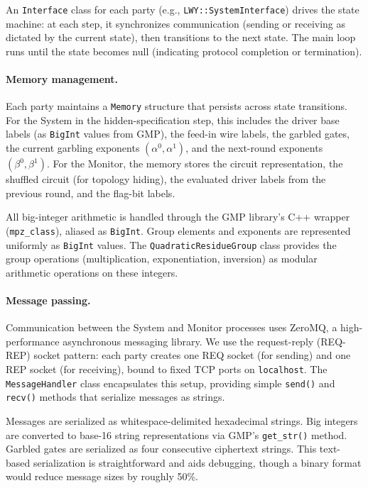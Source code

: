 An \texttt{Interface} class for each party (e.g., \texttt{LWY::SystemInterface}) drives the state machine: at each step, it synchronizes communication (sending or receiving as dictated by the current state), then transitions to the next state. The main loop runs until the state becomes null (indicating protocol completion or termination).

\paragraph{Memory management.}
Each party maintains a \texttt{Memory} structure that persists across state transitions. For the System in the hidden-specification step, this includes the driver base labels (as \texttt{BigInt} values from GMP), the feed-in wire labels, the garbled gates, the current garbling exponents $(\alpha^0, \alpha^1)$, and the next-round exponents $(\beta^0, \beta^1)$. For the Monitor, the memory stores the circuit representation, the shuffled circuit (for topology hiding), the evaluated driver labels from the previous round, and the flag-bit labels.

All big-integer arithmetic is handled through the GMP library's C++ wrapper (\texttt{mpz\_class}), aliased as \texttt{BigInt}. Group elements and exponents are represented uniformly as \texttt{BigInt} values. The \texttt{QuadraticResidueGroup} class provides the group operations (multiplication, exponentiation, inversion) as modular arithmetic operations on these integers.

\paragraph{Message passing.}
Communication between the System and Monitor processes uses ZeroMQ, a high-performance asynchronous messaging library. We use the request-reply (REQ-REP) socket pattern: each party creates one REQ socket (for sending) and one REP socket (for receiving), bound to fixed TCP ports on \texttt{localhost}. The \texttt{MessageHandler} class encapsulates this setup, providing simple \texttt{send()} and \texttt{recv()} methods that serialize messages as strings.

Messages are serialized as whitespace-delimited hexadecimal strings. Big integers are converted to base-16 string representations via GMP's \texttt{get\_str()} method. Garbled gates are serialized as four consecutive ciphertext strings. This text-based serialization is straightforward and aids debugging, though a binary format would reduce message sizes by roughly 50\%.

